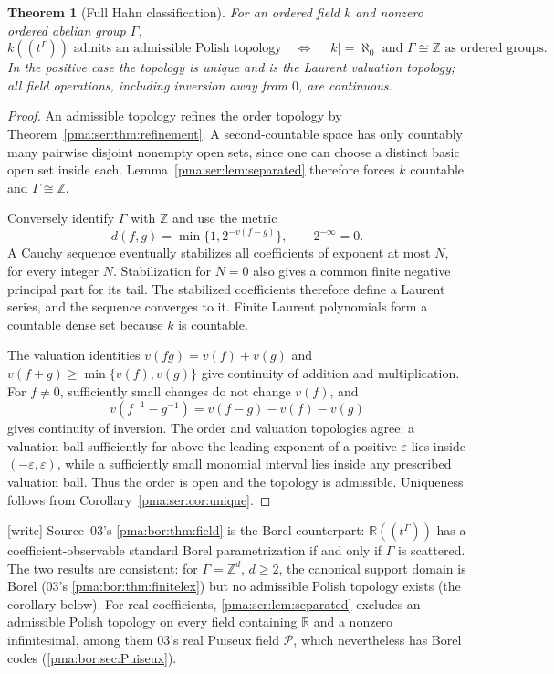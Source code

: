 \documentclass[11pt]{article}
\numberwithin{equation}{section}
\newtheorem{theorem}{Theorem}[section]
\theoremstyle{definition}
\theoremstyle{remark}
\newcommand{\Z}{\mathbb Z}
\newcommand{\R}{\mathbb R}
\newcommand{\Pui}{\mathcal P}
\newcommand{\writetag}{\textup{\textsf{\small[write]}}}
\begin{document}
\begin{theorem}[Full Hahn classification]\label{pma:ser:thm:hahn}
For an ordered field $k$ and nonzero ordered abelian group $\Gamma$,
\[
 k((t^\Gamma))\text{ admits an admissible Polish topology}
 \quad\Longleftrightarrow\quad
 |k|=\aleph_0\text{ and }\Gamma\cong\Z
 \text{ as ordered groups}.
\]
In the positive case the topology is unique and is the Laurent valuation
topology; all field operations, including inversion away from $0$, are
continuous.
\end{theorem}
\begin{proof}
An admissible topology refines the order topology by
Theorem~\ref{pma:ser:thm:refinement}. A second-countable space has only countably many
pairwise disjoint nonempty open sets, since one can choose a distinct basic
open set inside each. Lemma~\ref{pma:ser:lem:separated} therefore forces $k$ countable
and $\Gamma\cong\Z$.

Conversely identify $\Gamma$ with $\Z$ and use the metric
\[
 d(f,g)=\min\{1,2^{-v(f-g)}\},\qquad 2^{-\infty}=0.
\]
A Cauchy sequence eventually stabilizes all coefficients of exponent at most
$N$, for every integer $N$. Stabilization for $N=0$ also gives a common finite
negative principal part for its tail. The stabilized coefficients therefore
define a Laurent series, and the sequence converges to it. Finite Laurent
polynomials form a countable dense set because $k$ is countable.

The valuation identities
$v(fg)=v(f)+v(g)$ and
$v(f+g)\geq\min\{v(f),v(g)\}$ give continuity of addition and multiplication.
For $f\ne0$, sufficiently small changes do not change $v(f)$, and
\[
 v(f^{-1}-g^{-1})=v(f-g)-v(f)-v(g)
\]
gives continuity of inversion.
The order and valuation topologies agree: a valuation ball sufficiently far
above the leading exponent of a positive $\varepsilon$ lies inside
$(-\varepsilon,\varepsilon)$, while a sufficiently small monomial interval
lies inside any prescribed valuation ball. Thus the order is open and the
topology is admissible. Uniqueness follows from Corollary~\ref{pma:ser:cor:unique}.
\end{proof}

\noindent\writetag{} Source~03's \cref{pma:bor:thm:field} is the Borel
counterpart: $\R((t^\Gamma))$ has a coefficient-observable standard Borel
parametrization if and only if $\Gamma$ is scattered. The two results are
consistent: for $\Gamma=\Z^d$, $d\ge2$, the canonical support domain is Borel
(03's \cref{pma:bor:thm:finitelex}) but no admissible Polish topology exists
(the corollary below). For real coefficients, \cref{pma:ser:lem:separated}
excludes an admissible Polish topology on every field containing $\R$ and a
nonzero infinitesimal, among them 03's real Puiseux field $\Pui$, which
nevertheless has Borel codes (\cref{pma:bor:sec:Puiseux}).
\end{document}
